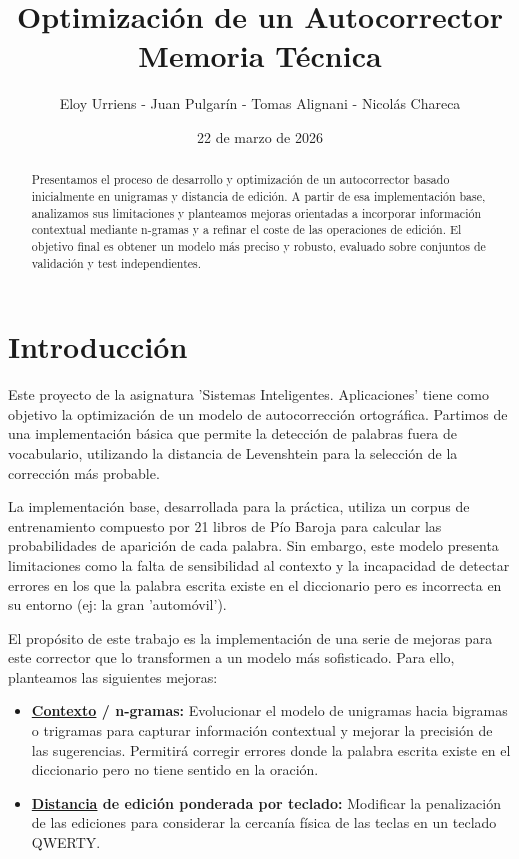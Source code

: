 \documentclass[12pt,a4paper]{article}
\title{Optimización de un Autocorrector \\ Memoria Técnica}
\author{Eloy Urriens - Juan Pulgarín - Tomas Alignani - Nicolás Chareca}
\date{22 de marzo de 2026}
\begin{document}
\maketitle

\begin{abstract}
Presentamos el proceso de desarrollo y optimización de un autocorrector basado inicialmente en unigramas y distancia de edición. A partir de esa implementación base, analizamos sus limitaciones y planteamos mejoras orientadas a incorporar información contextual mediante n-gramas y a refinar el coste de las operaciones de edición. El objetivo final es obtener un modelo más preciso y robusto, evaluado sobre conjuntos de validación y test independientes.
\end{abstract}

\clearpage

\tableofcontents
\newpage

\section{Introducción}

Este proyecto de la asignatura 'Sistemas Inteligentes. Aplicaciones' tiene como objetivo la optimización de un modelo de autocorrección ortográfica. Partimos de una implementación básica que permite la detección de palabras fuera de vocabulario, utilizando la distancia de Levenshtein para la selección de la corrección más probable.

La implementación base, desarrollada para la práctica, utiliza un corpus de entrenamiento compuesto por 21 libros de Pío Baroja para calcular las probabilidades de aparición de cada palabra. Sin embargo, este modelo presenta limitaciones como la falta de sensibilidad al contexto y la incapacidad de detectar errores en los que la palabra escrita existe en el diccionario pero es incorrecta en su entorno (ej: la gran 'automóvil').

El propósito de este trabajo es la implementación de una serie de mejoras para este corrector que lo transformen a un modelo más sofisticado. Para ello, planteamos las siguientes mejoras:

\begin{itemize}
    \item \textbf{\underline{Contexto} / n-gramas:} Evolucionar el modelo de unigramas hacia bigramas o trigramas para capturar información contextual y mejorar la precisión de las sugerencias. Permitirá corregir errores donde la palabra escrita existe en el diccionario pero no tiene sentido en la oración.
    \item \textbf{\underline{Distancia} de edición ponderada por teclado:} Modificar la penalización de las ediciones para considerar la cercanía física de las teclas en un teclado QWERTY.
\end{itemize}
\end{document}
